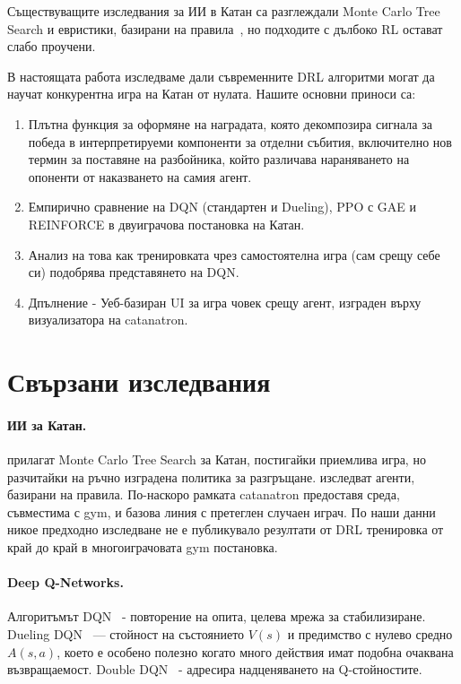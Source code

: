 \documentclass[11pt,a4paper]{article}
\begin{document}
Съществуващите изследвания за ИИ в Катан са разглеждали Monte Carlo Tree
Search и евристики, базирани на
правила~\citep{szita2010monte}, но подходите с дълбоко RL остават
слабо проучени.

В настоящата работа изследваме дали съвременните DRL алгоритми могат да
научат конкурентна игра на Катан от нулата. Нашите основни приноси са:

\begin{enumerate}[leftmargin=1.5em]
    \item Плътна функция за оформяне на наградата, която декомпозира сигнала
    за победа в интерпретируеми компоненти за отделни събития, включително нов
    термин за поставяне на разбойника, който различава нараняването на опоненти
    от наказването на самия агент.
    \item Емпирично сравнение на DQN (стандартен и Dueling), PPO с GAE и
    REINFORCE в двуиграчова постановка на Катан.
    \item Анализ на това как тренировката чрез самостоятелна игра (сам срещу себе си) подобрява
    представянето на DQN.
    \item Дпълнение - Уеб-базиран UI за игра човек срещу агент, изграден върху
    визуализатора на {catanatron}.
\end{enumerate}

\section{Свързани изследвания}

\paragraph{ИИ за Катан.}
\citet{szita2010monte} прилагат Monte Carlo Tree Search за Катан, постигайки
приемлива игра, но разчитайки на ръчно изградена политика за разгръщане.
\citet{pfeiffer2004} изследват агенти, базирани на правила. По-наскоро
рамката {catanatron} \citep{collazo2021catanatron} предоставя среда,
съвместима с gym, и базова линия с претеглен случаен играч. По наши данни
никое предходно изследване не е публикувало резултати от DRL тренировка от
край до край в многоиграчовата gym постановка.

\paragraph{Deep Q-Networks.}
Алгоритъмът DQN~\citep{mnih2015human} - повторение на опита, целева
мрежа за стабилизиране. Dueling DQN~\citep{wang2016dueling} --- стойност на
състоянието $V(s)$ и предимство с нулево средно $A(s,a)$, което е особено
полезно когато много действия имат подобна очаквана възвращаемост. Double DQN~\citep{hasselt2016deep} - адресира надценяването на
Q-стойностите.
\end{document}
